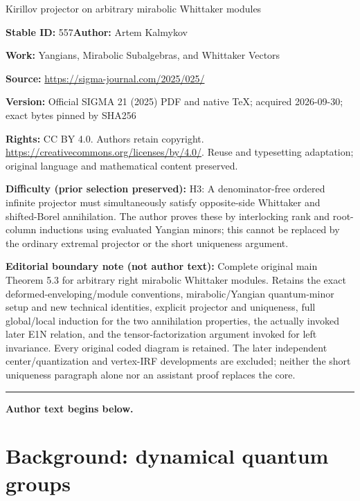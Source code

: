 \documentclass[11pt]{article}
\numberwithin{equation}{section}
\begin{document}
\begin{center}\Large Kirillov projector on arbitrary mirabolic Whittaker modules\end{center}
\noindent\textbf{Stable ID:} 557\quad\textbf{Author:} Artem Kalmykov\par
\noindent\textbf{Work:} Yangians, Mirabolic Subalgebras, and Whittaker Vectors\par
\noindent\textbf{Source:} \url{https://sigma-journal.com/2025/025/}\par
\noindent\textbf{Version:} Official SIGMA 21 (2025) PDF and native TeX; acquired 2026-09-30; exact bytes pinned by SHA256\par
\noindent\textbf{Rights:} CC BY 4.0. Authors retain copyright. \url{https://creativecommons.org/licenses/by/4.0/}. Reuse and typesetting adaptation; original language and mathematical content preserved.\par
\noindent\textbf{Difficulty (prior selection preserved):} {\CJKfont H3: A denominator-free ordered infinite projector must simultaneously satisfy opposite-side Whittaker and shifted-Borel annihilation. The author proves these by interlocking rank and root-column inductions using evaluated Yangian minors; this cannot be replaced by the ordinary extremal projector or the short uniqueness argument.}\par
\medskip\noindent\textbf{Editorial boundary note (not author text):} Complete original main Theorem 5.3 for arbitrary right mirabolic Whittaker modules. Retains the exact deformed-enveloping/module conventions, mirabolic/Yangian quantum-minor setup and new technical identities, explicit projector and uniqueness, full global/local induction for the two annihilation properties, the actually invoked later E1N relation, and the tensor-factorization argument invoked for left invariance. Every original coded diagram is retained. The later independent center/quantization and vertex-IRF developments are excluded; neither the short uniqueness paragraph alone nor an assistant proof replaces the core.\par
\medskip\hrule\medskip\noindent\textbf{Author text begins below.}\par
\setcounter{section}{1}
	\section{Background: dynamical quantum groups}
	\label{sect::dynamical_quantum_groups}
	
	\renewcommand{\theequation}{\arabic{section}.\arabic{equation}}
	
\end{document}
